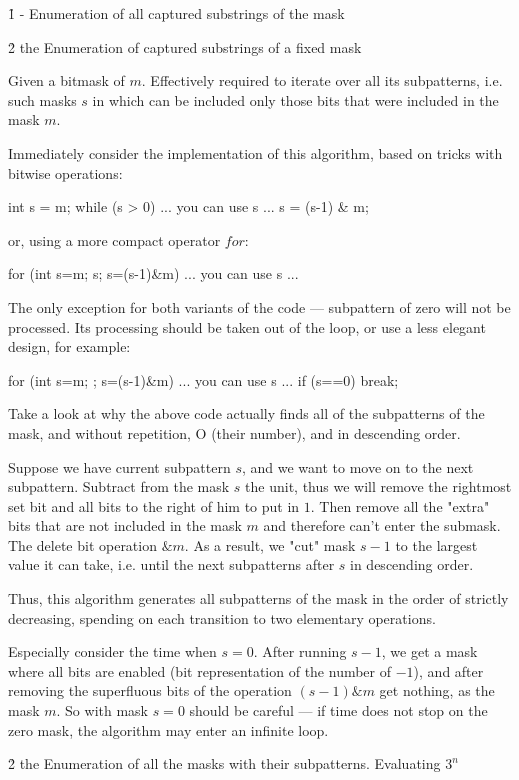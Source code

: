 \h1 {- Enumeration of all captured substrings of the mask }


\h2{ the Enumeration of captured substrings of a fixed mask }

Given a bitmask of $m$. Effectively required to iterate over all its subpatterns, i.e. such masks $s$ in which can be included only those bits that were included in the mask $m$.

Immediately consider the implementation of this algorithm, based on tricks with bitwise operations:

\code
int s = m;
while (s > 0) {
... you can use s ...
s = (s-1) & m;
}
\endcode

or, using a more compact operator $for$:

\code
for (int s=m; s; s=(s-1)&m)
... you can use s ...
\endcode

The only exception for both variants of the code --- subpattern of zero will not be processed. Its processing should be taken out of the loop, or use a less elegant design, for example:

\code
for (int s=m; ; s=(s-1)&m) {
... you can use s ...
if (s==0) break;
}
\endcode

Take a look at why the above code actually finds all of the subpatterns of the mask, and without repetition, O (their number), and in descending order.

Suppose we have current subpattern $s$, and we want to move on to the next subpattern. Subtract from the mask $s$ the unit, thus we will remove the rightmost set bit and all bits to the right of him to put in $1$. Then remove all the "extra" bits that are not included in the mask $m$ and therefore can't enter the submask. The delete bit operation $\& m$. As a result, we "cut" mask $s-1$ to the largest value it can take, i.e. until the next subpatterns after $s$ in descending order.

Thus, this algorithm generates all subpatterns of the mask in the order of strictly decreasing, spending on each transition to two elementary operations.

Especially consider the time when $s = 0$. After running $s-1$, we get a mask where all bits are enabled (bit representation of the number of $-1$), and after removing the superfluous bits of the operation $(s-1) \& m$ get nothing, as the mask $m$. So with mask $s = 0$ should be careful --- if time does not stop on the zero mask, the algorithm may enter an infinite loop.


\h2{ the Enumeration of all the masks with their subpatterns. Evaluating $3^n$ }


